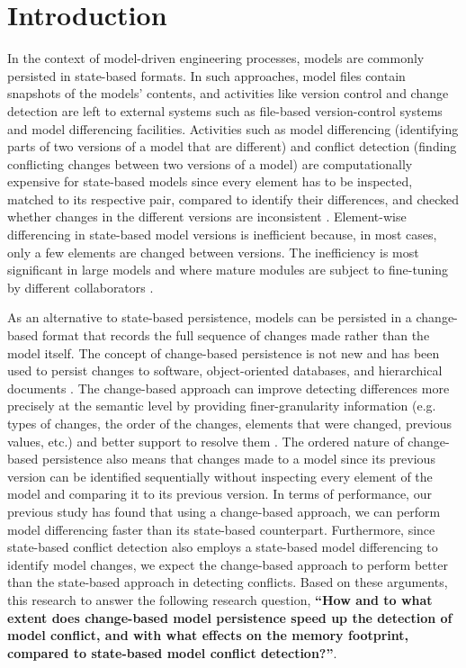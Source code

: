 \section{Introduction}
\label{sec:introduction}

In the context of model-driven engineering processes, models are commonly persisted in state-based formats. In such approaches, model files contain snapshots of the models' contents, and activities like version control and change detection are left to external systems such as file-based version-control systems and model differencing facilities. Activities such as model differencing (identifying parts of two versions of a model that are different) and conflict detection (finding conflicting changes between two versions of a model) are computationally expensive for state-based models \cite{Kolovos:2009:DMM:1564596.1564641} since every element has to be inspected, matched to its respective pair, compared to identify their differences, and checked whether changes in the different versions are inconsistent \cite{emfcompare2018developer}. Element-wise differencing in state-based model versions is inefficient because, in most cases, only a few elements are changed between versions. The inefficiency is most significant in large models and where mature modules are subject to fine-tuning by different collaborators \cite{selic2003pragmatics}. 

As an alternative to state-based persistence, models can be persisted in a change-based format that records the full sequence of changes made rather than the model itself. The concept of change-based persistence is not new and has been used to persist changes to software, object-oriented databases, and hierarchical documents \cite{DBLP:journals/entcs/RobbesL07,DBLP:conf/sde/LippeO92,DBLP:conf/caise/IgnatN05}. The change-based approach can improve detecting differences more precisely at the semantic level by providing finer-granularity information (e.g. types of changes, the order of the changes, 
elements that were changed, previous values, etc.) and better support to resolve them \cite{mens2002state}. The ordered nature of change-based persistence also means that changes made to a model since its previous version can be identified sequentially without inspecting every element of the model and comparing it to its previous version. 
In terms of performance, our previous study \cite{yohannis2019efficient} has found that using a change-based approach, we can perform model differencing faster than its state-based counterpart. Furthermore, since state-based conflict detection also employs a state-based model differencing to identify model changes, we expect the change-based approach to perform better than the state-based approach in detecting conflicts. Based on these arguments, this research to answer the following research question, \textbf{``How and to what extent does change-based model persistence speed up the detection of model conflict, and with what effects on the memory footprint, compared to state-based model conflict detection?''}. 


